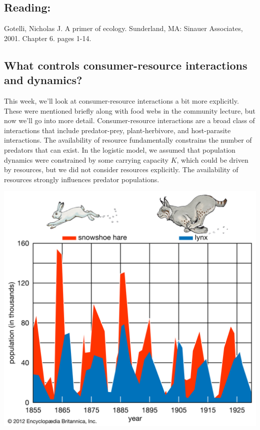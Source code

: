 \documentclass[12pt]{article}
\begin{document}
\subsection*{Reading:}

Gotelli, Nicholas J. A primer of ecology. Sunderland, MA: Sinauer Associates, 2001. Chapter 6. pages 1-14. \\







\begin{center}
\noindent\hrulefill 
\end{center}



\clearpage

\subsection*{What controls consumer-resource interactions and dynamics?}

This week, we'll look at consumer-resource interactions a bit more explicitly. These were mentioned briefly along with food webs in the community lecture, but now we'll go into more detail. Consumer-resource interactions are a broad class of interactions that include predator-prey, plant-herbivore, and host-parasite interactions. The availability of resource fundamentally constrains the number of predators that can exist. In the logistic model, we assumed that population dynamics were constrained by some carrying capacity $K$, which could be driven by resources, but we did not consider resources explicitly. The availability of resources strongly influences predator populations. 



\includegraphics[width=\textwidth]{figs/lynx.jpg}
\end{document}

